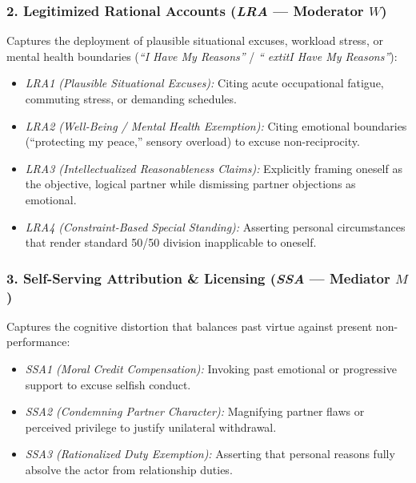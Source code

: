 \subsubsection{2. Legitimized Rational Accounts (\textit{LRA} --- Moderator $W$)}
Captures the deployment of plausible situational excuses, workload stress, or mental health boundaries (\textit{``I Have My Reasons''} / \textit{``	extit{I Have My Reasons''}}):
\begin{itemize}[leftmargin=*]
    \item \textit{LRA1 (Plausible Situational Excuses):} Citing acute occupational fatigue, commuting stress, or demanding schedules.
    \item \textit{LRA2 (Well-Being / Mental Health Exemption):} Citing emotional boundaries (``protecting my peace,'' sensory overload) to excuse non-reciprocity.
    \item \textit{LRA3 (Intellectualized Reasonableness Claims):} Explicitly framing oneself as the objective, logical partner while dismissing partner objections as emotional.
    \item \textit{LRA4 (Constraint-Based Special Standing):} Asserting personal circumstances that render standard 50/50 division inapplicable to oneself.
\end{itemize}

\subsubsection{3. Self-Serving Attribution \& Licensing (\textit{SSA} --- Mediator $M$)}
Captures the cognitive distortion that balances past virtue against present non-performance:
\begin{itemize}[leftmargin=*]
    \item \textit{SSA1 (Moral Credit Compensation):} Invoking past emotional or progressive support to excuse selfish conduct.
    \item \textit{SSA2 (Condemning Partner Character):} Magnifying partner flaws or perceived privilege to justify unilateral withdrawal.
    \item \textit{SSA3 (Rationalized Duty Exemption):} Asserting that personal reasons fully absolve the actor from relationship duties.
\end{itemize}

